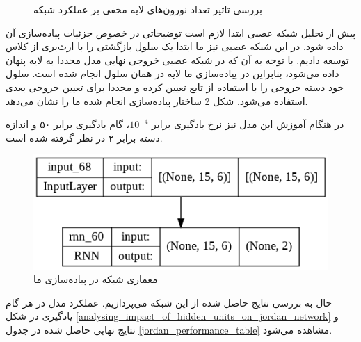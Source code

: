 \documentclass[12pt, a4paper]{article}
\begin{document}
\begin{figure}
\begin{subfigure}{0.45\linewidth}
    \end{subfigure}
    \caption{بررسی تاثیر تعداد نورون‌های لایه مخفی بر عملکرد شبکه }
    \label{analysing_impact_of_hidden_units_on_elman_network}
\end{figure}

\clearpage

پیش از تحلیل شبکه عصبی  ابتدا لازم است توضیحاتی در خصوص جزئیات پیاده‌سازی آن داده شود.
در این شبکه عصبی نیز ما ابتدا یک سلول بازگشتی را با ارث‌بری از کلاس  توسعه دادیم. با توجه به آن که
در شبکه عصبی  خروجی نهایی مدل مجددا به لایه پنهان داده می‌شود، بنابراین در پیاده‌سازی ما لایه 
در همان سلول انجام شده است. سلول خود دسته خروجی را با استفاده از تابع  تعیین کرده و مجددا برای تعیین
خروجی بعدی استفاده می‌شود. شکل \ref{jordan_architecture} ساختار پیاده‌سازی انجام شده ما را نشان می‌دهد.

در هنگام آموزش این مدل نیز نرخ یادگیری برابر $10^{-4}$، گام یادگیری برابر ۵۰ و اندازه دسته برابر ۲ در نظر گرفته شده
است.

\begin{figure}[h]
    \centering
    \includegraphics[scale=0.5]{images/q1/jordan/architecture.png}
    \caption{معماری شبکه  در پیاده‌سازی ما}
    \label{jordan_architecture}
\end{figure}

حال به بررسی نتایج حاصل شده از این شبکه می‌پردازیم. عملکرد مدل در هر گام یادگیری در شکل
\ref{analysing_impact_of_hidden_units_on_jordan_network} و نتایج نهایی حاصل شده در جدول \ref{jordan_performance_table}
مشاهده می‌شود.
\end{document}
